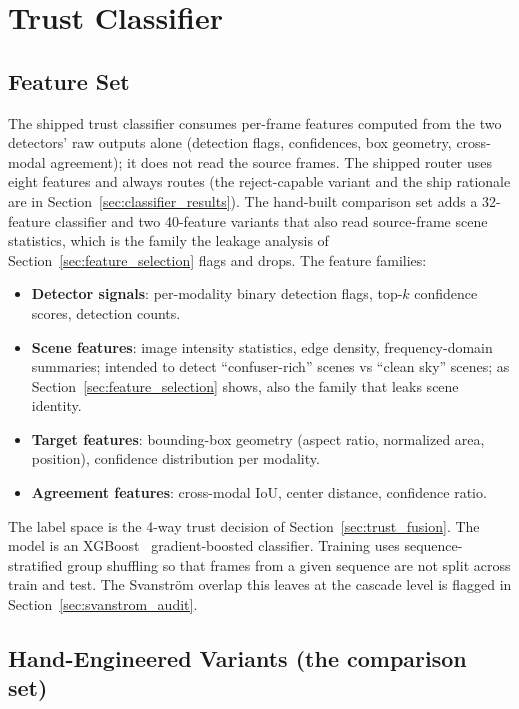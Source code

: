 \section{Trust Classifier}
\label{sec:trust_classifier}

\subsection{Feature Set}

The shipped trust classifier consumes per-frame features computed from the two detectors' raw outputs alone (detection flags, confidences, box geometry, cross-modal agreement); it does not read the source frames. The shipped router uses eight features and always routes (the reject-capable variant and the ship rationale are in Section~\ref{sec:classifier_results}). The hand-built comparison set adds a 32-feature classifier and two 40-feature variants that also read source-frame scene statistics, which is the family the leakage analysis of Section~\ref{sec:feature_selection} flags and drops. The feature families:

\begin{itemize}
    \item \textbf{Detector signals}: per-modality binary detection flags, top-$k$ confidence scores, detection counts.
    \item \textbf{Scene features}: image intensity statistics, edge density, frequency-domain summaries; intended to detect ``confuser-rich'' scenes vs ``clean sky'' scenes; as Section~\ref{sec:feature_selection} shows, also the family that leaks scene identity.
    \item \textbf{Target features}: bounding-box geometry (aspect ratio, normalized area, position), confidence distribution per modality.
    \item \textbf{Agreement features}: cross-modal IoU, center distance, confidence ratio.
\end{itemize}

The label space is the 4-way trust decision of Section~\ref{sec:trust_fusion}. The model is an XGBoost~\cite{chen2016xgboost} gradient-boosted classifier. Training uses sequence-stratified group shuffling so that frames from a given sequence are not split across train and test. The Svanstr\"om overlap this leaves at the cascade level is flagged in Section~\ref{sec:svanstrom_audit}.

\subsection{Hand-Engineered Variants (the comparison set)}
\label{sec:classifier_variants}

